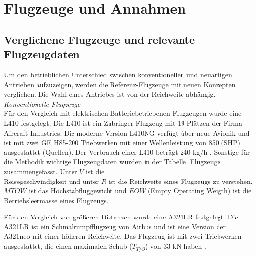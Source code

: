 \section{Flugzeuge und Annahmen}
\subsection{Verglichene Flugzeuge und relevante Flugzeugdaten}
\label{ss:Relevante Flugzeugdaten}
%
Um den betrieblichen Unterschied zwischen konventionellen und neuartigen Antrieben aufzuzeigen, 
werden die Referenz-Flugzeuge mit neuen Konzepten verglichen. 
Die Wahl eines Antriebes ist von der Reichweite abhängig.\\
%
\textit{Konventionelle Flugzeuge}\\
%
Für den Vergleich mit elektrischen Batteriebetriebenen Flugzeugen wurde eine L410 festgelegt. 
Die L410 ist ein Zubringer-Flugzeug mit 19 Plätzen der Firma Aircraft Industries. 
Die moderne Version L410NG verfügt über neue Avionik und ist mit zwei GE H85-200 Triebwerken 
mit einer Wellenleistung von 850 (SHP) ausgestattet (Quellen).
Der Verbrauch einer L410 beträgt 240 kg/h \cite{let2016l410}. 
Sonstige für die Methodik wichtige Flugzeugdaten wurden in der Tabelle \ref{Flugzeuge} zusammengefasst.
Unter $V$ ist die \\ Reisegeschwindigkeit und unter $R$ ist die Reichweite eines Flugzeugs zu verstehen. 
$MTOW$ ist das Höchstabfluggewicht und $EOW$ (Empty Operating Weigth) ist die Betriebsleermasse eines Flugzeugs.

Für den Vergleich von größeren Distanzen wurde eine A321LR festgelegt. 
Die A321LR ist ein Schmalrumpfflugzeug von Airbus und ist eine 
Version der A321neo mit einer höheren Reichweite.
Das Flugzeug ist mit zwei Triebwerken ausgestattet, 
die einen maximalen Schub ($T_{T/O}$) von 33 kN haben \cite{eurocontrol_a321}.


